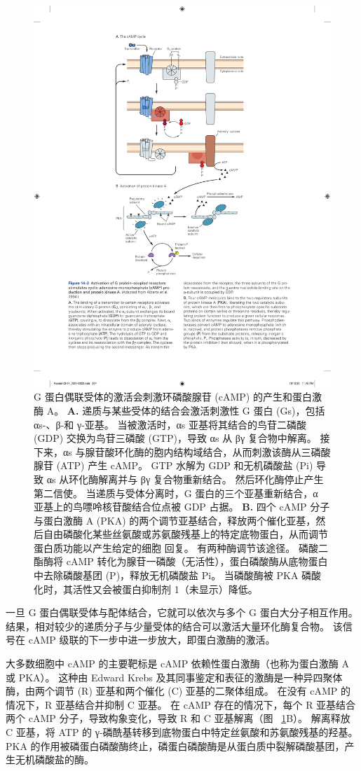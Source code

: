 \begin{figure}[htbp]
	\centering
	\includegraphics[width=0.65\linewidth]{chap14/fig_14_2}
	\caption{G 蛋白偶联受体的激活会刺激环磷酸腺苷 (cAMP) 的产生和蛋白激酶 A\cite{alberts2017molecular}。
		\textbf{A.} 递质与某些受体的结合会激活刺激性 G 蛋白 (Gs)，包括 αs-、β-和 γ-亚基。
		当被激活时，αs 亚基将其结合的鸟苷二磷酸 (GDP) 交换为鸟苷三磷酸 (GTP)，导致 αs 从 βγ 复合物中解离。
		接下来，αs 与腺苷酸环化酶的胞内结构域结合，从而刺激该酶从三磷酸腺苷 (ATP) 产生 cAMP。
		GTP 水解为 GDP 和无机磷酸盐 (Pi) 导致 αs 从环化酶解离并与 βγ 复合物重新结合。
		然后环化酶停止产生第二信使。
		当递质与受体分离时，G 蛋白的三个亚基重新结合，α 亚基上的鸟嘌呤核苷酸结合位点被 GDP 占据。
		\textbf{B.} 四个 cAMP 分子与蛋白激酶 A (PKA) 的两个调节亚基结合，释放两个催化亚基，然后自由磷酸化某些丝氨酸或苏氨酸残基上的特定底物蛋白，从而调节蛋白质功能以产生给定的细胞 回复。
		有两种酶调节该途径。
		磷酸二酯酶将 cAMP 转化为腺苷一磷酸（无活性），蛋白磷酸酶从底物蛋白中去除磷酸基团 (P)，释放无机磷酸盐 Pi。
		当磷酸酶被 PKA 磷酸化时，其活性又会被蛋白抑制剂 1（未显示）降低。}
	\label{fig:14_2}
\end{figure}


一旦 G 蛋白偶联受体与配体结合，它就可以依次与多个 G 蛋白大分子相互作用。
结果，相对较少的递质分子与少量受体的结合可以激活大量环化酶复合物。
该信号在 cAMP 级联的下一步中进一步放大，即蛋白激酶的激活。


大多数细胞中 cAMP 的主要靶标是 cAMP 依赖性蛋白激酶（也称为蛋白激酶 A 或 PKA）。
这种由 Edward Krebs 及其同事鉴定和表征的激酶是一种异四聚体酶，由两个调节 (R) 亚基和两个催化 (C) 亚基的二聚体组成。
在没有 cAMP 的情况下，R 亚基结合并抑制 C 亚基。 在 cAMP 存在的情况下，每个 R 亚基结合两个 cAMP 分子，导致构象变化，导致 R 和 C 亚基解离（图 ~\ref{fig:14_2}B）。
解离释放 C 亚基，将 ATP 的 γ-磷酰基转移到底物蛋白中特定丝氨酸和苏氨酸残基的羟基。
PKA 的作用被磷蛋白磷酸酶终止，磷蛋白磷酸酶是从蛋白质中裂解磷酸基团，产生无机磷酸盐的酶。


